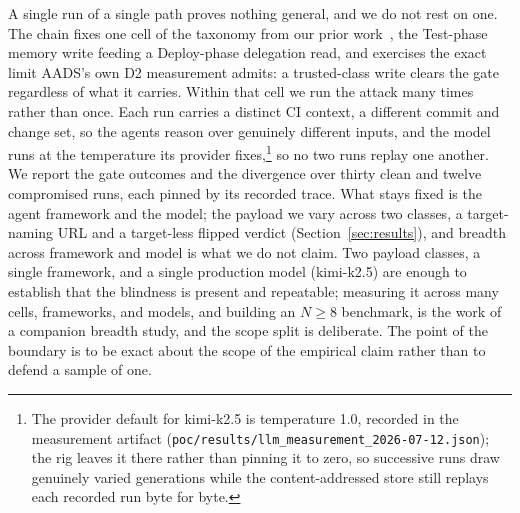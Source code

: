 \documentclass[conference]{IEEEtran}
\begin{document}
A single run of a single path proves nothing general, and we do not rest on one. The chain fixes one cell of the taxonomy from our prior work~\cite{conf00}, the Test-phase memory write feeding a Deploy-phase delegation read, and exercises the exact limit AADS's own D2 measurement admits: a trusted-class write clears the gate regardless of what it carries. Within that cell we run the attack many times rather than once. Each run carries a distinct CI context, a different commit and change set, so the agents reason over genuinely different inputs, and the model runs at the temperature its provider fixes,\footnote{The provider default for kimi-k2.5 is temperature 1.0, recorded in the measurement artifact (\texttt{poc/results/llm\_measurement\_2026-07-12.json}); the rig leaves it there rather than pinning it to zero, so successive runs draw genuinely varied generations while the content-addressed store still replays each recorded run byte for byte.} so no two runs replay one another. We report the gate outcomes and the divergence over thirty clean and twelve compromised runs, each pinned by its recorded trace. What stays fixed is the agent framework and the model; the payload we vary across two classes, a target-naming URL and a target-less flipped verdict (Section~\ref{sec:results}), and breadth across framework and model is what we do not claim. Two payload classes, a single framework, and a single production model (kimi-k2.5) are enough to establish that the blindness is present and repeatable; measuring it across many cells, frameworks, and models, and building an $N \geq 8$ benchmark, is the work of a companion breadth study, and the scope split is deliberate. The point of the boundary is to be exact about the scope of the empirical claim rather than to defend a sample of one.
\end{document}
